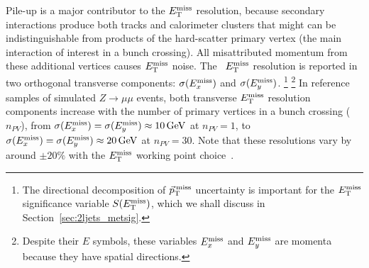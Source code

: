 Pile-up is a major contributor to the $\met$ resolution, because secondary
interactions produce both tracks and calorimeter clusters that might can be
indistinguishable from products of the hard-scatter primary vertex
(the main interaction of interest in a bunch crossing).
All misattributed momentum from these additional vertices causes $\met$ noise.
The \atlas\ $\met$ resolution is reported in two orthogonal transverse
components: $\sigma(\metx)$ and $\sigma(\mety)$.%
\footnote{%
The directional decomposition of $\ptmiss$ uncertainty is important for the
$\met$ significance variable $\metsig$, which we shall discuss in
Section~\ref{sec:2ljets_metsig}.
}%
\footnote{%
Despite their $E$ symbols, these variables $\metx$ and $\mety$ are momenta
because they have spatial directions.%
}
In reference samples of simulated $Z \to \mu\mu$ events, both transverse
$\met$ resolution components increase with the number of primary vertices in a
bunch crossing ($n_{PV}$), from
$\sigma(\metx) = \sigma(\mety) \approx 10\,\eV[G]$ at $n_{PV} = 1$, to
$\sigma(\metx) = \sigma(\mety) \approx 20\,\eV[G]$ at $n_{PV} = 30$.
Note that these resolutions vary by around $\pm 20\%$ with the $\met$
working point choice~\cite{ATLAS-CONF-2018-023}.



